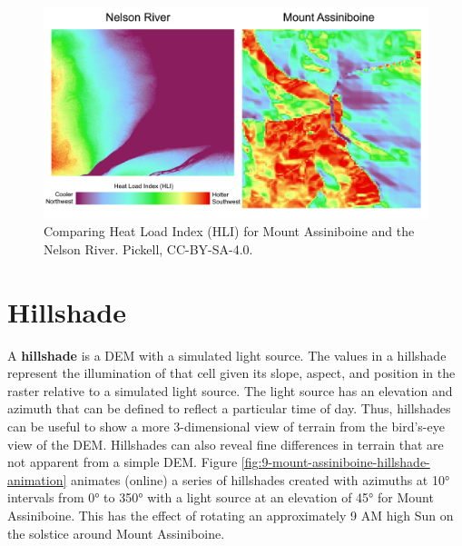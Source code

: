\documentclass[
]{book}
\begin{document}
\begin{figure}
\includegraphics[width=0.75\linewidth]{images/09-mount-assiniboine-nelson-river-heat-load-index} \caption{Comparing Heat Load Index (HLI) for Mount Assiniboine and the Nelson River. Pickell, CC-BY-SA-4.0.}\label{fig:9-mount-assiniboine-nelson-river-heat-load-index}
\end{figure}

\hypertarget{hillshade}{%
\section{Hillshade}\label{hillshade}}

A \textbf{hillshade} is a DEM with a simulated light source. The values in a hillshade represent the illumination of that cell given its slope, aspect, and position in the raster relative to a simulated light source. The light source has an elevation and azimuth that can be defined to reflect a particular time of day. Thus, hillshades can be useful to show a more 3-dimensional view of terrain from the bird's-eye view of the DEM. Hillshades can also reveal fine differences in terrain that are not apparent from a simple DEM. Figure \ref{fig:9-mount-assiniboine-hillshade-animation} animates (online) a series of hillshades created with azimuths at 10° intervals from 0° to 350° with a light source at an elevation of 45° for Mount Assiniboine. This has the effect of rotating an approximately 9 AM high Sun on the solstice around Mount Assiniboine.
\end{document}
